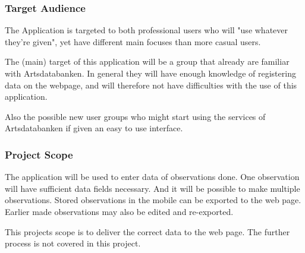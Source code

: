 \subsubsection{Target Audience}
	The Application is targeted to both professional users who will "use whatever they're given", yet have different main focuses than more casual users.

	The (main) target of this application will be a group that already are familiar with Artsdatabanken. In general they will have enough knowledge of registering data on the webpage, and will therefore not have difficulties with the use of this application. 

	Also the possible new user groups who might start using the services of Artsdatabanken if given an easy to use interface.


\subsubsection{Project Scope}
The application will be used to enter data of observations done. One observation will have sufficient data fields necessary. And it will be possible to make multiple observations. Stored observations in the mobile can be exported to the web page. Earlier made observations may also be edited and re-exported.

	This projects scope is to deliver the correct data to the web page. The further process is not covered in this project.
